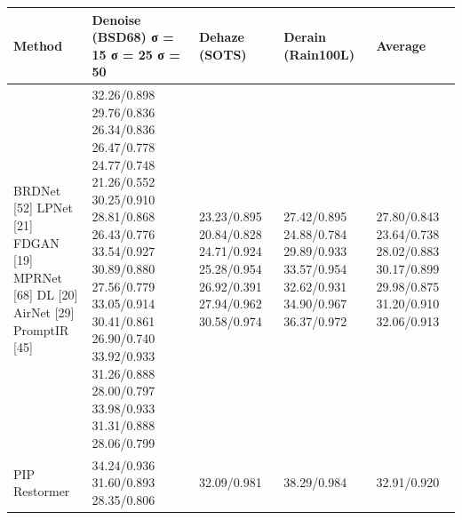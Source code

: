 \begin{tabular}{lllll}
\toprule
Method & Denoise (BSD68) σ = 15 σ = 25 σ = 50 & Dehaze (SOTS) & Derain (Rain100L) & Average \\
\midrule
BRDNet [52] LPNet [21] FDGAN [19] MPRNet [68] DL [20] AirNet [29] PromptIR [45] & 32.26/0.898 29.76/0.836 26.34/0.836 26.47/0.778 24.77/0.748 21.26/0.552 30.25/0.910 28.81/0.868 26.43/0.776 33.54/0.927 30.89/0.880 27.56/0.779 33.05/0.914 30.41/0.861 26.90/0.740 33.92/0.933 31.26/0.888 28.00/0.797 33.98/0.933 31.31/0.888 28.06/0.799 & 23.23/0.895 20.84/0.828 24.71/0.924 25.28/0.954 26.92/0.391 27.94/0.962 30.58/0.974 & 27.42/0.895 24.88/0.784 29.89/0.933 33.57/0.954 32.62/0.931 34.90/0.967 36.37/0.972 & 27.80/0.843 23.64/0.738 28.02/0.883 30.17/0.899 29.98/0.875 31.20/0.910 32.06/0.913 \\
PIP Restormer & 34.24/0.936 31.60/0.893 28.35/0.806 & 32.09/0.981 & 38.29/0.984 & 32.91/0.920 \\
\bottomrule
\end{tabular}
